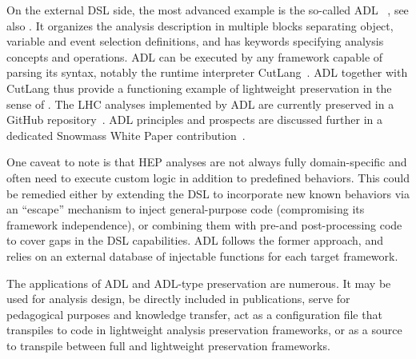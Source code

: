 \documentclass[11pt]{article}
\begin{document}
On the external \gls{DSL} side, the most advanced example is the so-called \gls{ADL}%
~\cite{adlweb, Unel:2021edl}, see also \cite{LHCReinterpretationForum:2020xtr}. 
It organizes the analysis description in multiple blocks separating object, variable and event selection definitions, and has keywords specifying analysis concepts and operations. 
\gls{ADL} can be executed by any framework capable of parsing its syntax, notably the runtime interpreter CutLang~\cite{Sekmen:2018ehb}. \gls{ADL} together with CutLang thus provide a functioning example of lightweight preservation in the sense of . 
The \gls{LHC} analyses implemented by \gls{ADL} are currently preserved in a GitHub repository~\cite{adllhcanl}.  \gls{ADL} principles and prospects are discussed further in a dedicated Snowmass White Paper contribution~\cite{snowmass:ADL}.

One caveat to note is that \gls{HEP} analyses are not always fully domain-specific and often need to execute custom logic in addition to predefined behaviors.
This could be remedied either by extending the \gls{DSL} to incorporate new known behaviors via an ``escape'' mechanism to inject general-purpose code (compromising its framework independence), or combining them with pre-and post-processing code to cover gaps in the \gls{DSL} capabilities.
\gls{ADL}  follows the former approach, and relies on an external database of injectable functions for each target framework.

The applications of \gls{ADL} and \gls{ADL}-type preservation are numerous. It may be used for analysis design, be directly included in publications, serve for pedagogical purposes and knowledge transfer, 
act as a configuration file that transpiles to code in lightweight analysis preservation frameworks, or
as a source to transpile between full and lightweight preservation frameworks.


\end{document}
